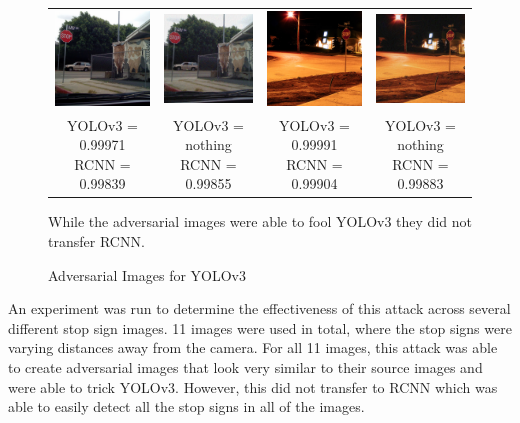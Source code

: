 \documentclass{article}
\begin{document}
\begin{figure}[h]
\begin{tabular}{c c@{\hskip 1cm} c c}
        \includegraphics[width=0.2\linewidth]{../test_images/stop3.png} &  \includegraphics[width=0.2\linewidth]{../test_images/adversarial_out/stop3.png} & 
        \includegraphics[width=0.2\linewidth]{../test_images/stop4.png} &  \includegraphics[width=0.2\linewidth]{../test_images/adversarial_out/stop4.png} \\

        \makecell[t]{YOLOv3 = 0.99971 \\ RCNN = 0.99839} & \makecell[t]{YOLOv3 = nothing \\ RCNN = 0.99855} & \makecell[t]{YOLOv3 = 0.99991 \\ RCNN = 0.99904} & \makecell[t]{YOLOv3 = nothing \\ RCNN = 0.99883} \\
    \end{tabular}
\caption{Adversarial Images for YOLOv3}
\medskip
\small
While the adversarial images were able to fool YOLOv3 they did not transfer RCNN.
\label{fig:yoloadversarial}
\end{figure}

An experiment was run to determine the effectiveness of this attack across several different stop sign images. 11 images were used in total, where the stop signs were varying distances away from the camera. For all 11 images, this attack was able to create adversarial images that look very similar to their source images and were able to trick YOLOv3. However, this did not transfer to RCNN \cite{ren2016faster} which was able to easily detect all the stop signs in all of the images.
\end{document}
